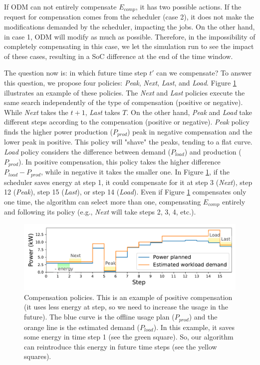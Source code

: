 If ODM can not entirely compensate $E_{comp}$, it has two possible actions. If the request for compensation comes from the scheduler (case 2), it does not make the modifications demanded by the scheduler, impacting the jobs. On the other hand, in case 1, ODM will modify as much as possible. Therefore, in the impossibility of completely compensating in this case, we let the simulation run to see the impact of these cases, resulting in a SoC difference at the end of the time window.

The question now is: in which future time step $t'$ can we compensate? To answer this question, we propose four policies: \emph{Peak}, \emph{Next}, \emph{Last}, and \emph{Load}. Figure \ref{fig:compensation} illustrates an example of these policies. The \emph{Next} and \emph{Last} policies execute the same search independently of the type of compensation (positive or negative). While \emph{Next} takes the $t + 1$, \emph{Last} takes $T$. On the other hand, \emph{Peak} and \emph{Load} take different steps according to the compensation (positive or negative). \emph{Peak} policy finds the higher power production ($P_{prod}$) peak in negative compensation and the lower peak in positive. This policy will "shave" the peaks, tending to a flat curve. \emph{Load} policy considers the difference between demand ($P_{load}$) and production ($P_{prod}$). In positive compensation, this policy takes the higher difference $P_{load} - P_{prod}$, while in negative it takes the smaller one. In Figure \ref{fig:compensation}, if the scheduler saves energy at step 1, it could compensate for it at step 3 (\emph{Next}), step 12 (\emph{Peak}), step 15 (\emph{Last}), or step 14 (\emph{Load}). Even if Figure \ref{fig:compensation} compensates only one time, the algorithm can select more than one, compensating $E_{comp}$ entirely and following its policy (e.g., \emph{Next} will take steps 2, 3, 4, etc.).

\begin{figure}[!htb]
    \centering
    \includegraphics[scale=0.7]{Images/Compensations/policies.pdf}
    \caption[Compensation policies]{Compensation policies. This is an example of positive compensation (it uses less energy at step, so we need to increase the usage in the future). The blue curve is the offline usage plan ($P_{prod}$) and the orange line is the estimated demand ($P_{load}$). In this example, it saves some energy in time step 1 (see the green square). So, our algorithm can reintroduce this energy in future time steps (see the yellow squares).}
    \label{fig:compensation}
\end{figure}

